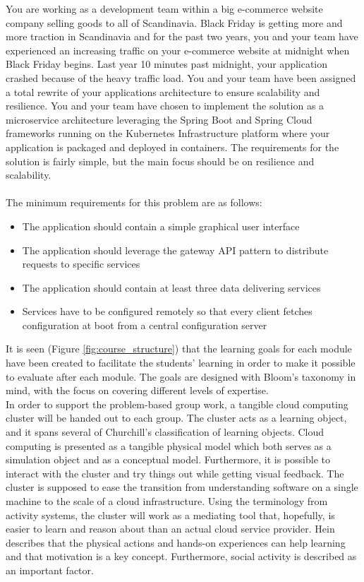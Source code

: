 \begin{kasse} 
You are working as a development team within a big e-commerce website company selling goods to all of Scandinavia. Black Friday is getting more and more traction in Scandinavia and for the past two years, you and your team have experienced an increasing traffic on your e-commerce website at midnight when Black Friday begins. Last year 10 minutes past midnight, your application crashed because of the heavy traffic load. You and your team have been assigned a total rewrite of your applications architecture to ensure scalability and resilience. You and your team have chosen to implement the solution as a microservice architecture leveraging the Spring Boot and Spring Cloud frameworks running on the Kubernetes Infrastructure platform where your application is packaged and deployed in containers. The requirements for the solution is fairly simple, but the main focus should be on resilience and scalability. 
\\ \\
\noindent 
The minimum requirements for this problem are as follows:
\begin{itemize}
    \item The application should contain a simple graphical user interface
    \item The application should leverage the gateway API pattern to distribute requests to specific services
    \item The application should contain at least three data delivering services
    \item Services have to be configured remotely so that every client fetches configuration at boot from a central configuration server
\end{itemize}
\end{kasse}


\noindent 
It is seen (Figure \ref{fig:course_structure}) that the learning goals for each module have been created to facilitate the students' learning in order to make it possible to evaluate after each module. The goals are designed with Bloom's taxonomy in mind, with the focus on covering different levels of expertise. \\


\noindent
In order to support the problem-based group work, a tangible cloud computing cluster will be handed out to each group. The cluster acts as a learning object, and it spans several of Churchill's classification of learning objects. Cloud computing is presented as a tangible physical model which both serves as a simulation object and as a conceptual model. Furthermore, it is possible to interact with the cluster and try things out while getting visual feedback. The cluster is supposed to ease the transition from understanding software on a single machine to the scale of a cloud infrastructure. Using the terminology from activity systems, the cluster will work as a mediating tool that, hopefully, is easier to learn and reason about than an actual cloud service provider. Hein describes that the physical actions and hands-on experiences can help learning and that motivation is a key concept. Furthermore, social activity is described as an important factor. \\

